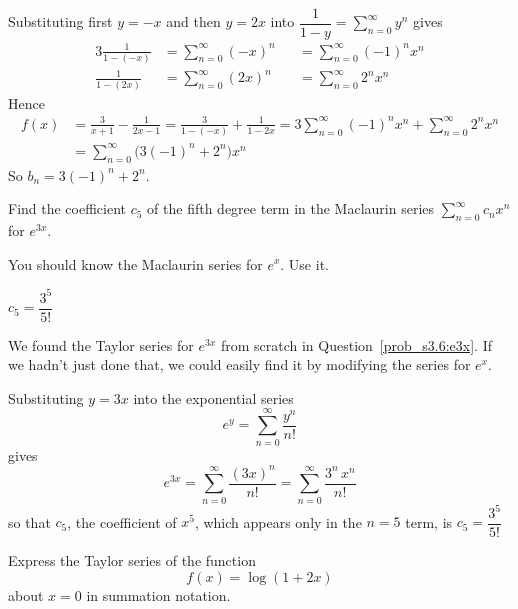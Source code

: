 \begin{solution}
Substituting first $y=-x$ and then $y=2x$ into
$\dfrac{1}{1-y} = \displaystyle\sum\limits_{n=0}^\infty y^n$ gives
\begin{alignat*}{3}
\frac{1}{1-(-x)} &= \sum_{n=0}^\infty (-x)^n&&=\sum_{n=0}^\infty (-1)^nx^n \\
\frac{1}{1-(2x)} &= \sum_{n=0}^\infty (2x)^n&&=\sum_{n=0}^\infty 2^nx^n
\end{alignat*}
Hence
\begin{align*}
f(x) &=\frac{3}{x+1} - \frac{1}{2x-1} = \frac{3}{1-(-x)} + \frac{1}{1-2x}
=3\sum_{n=0}^\infty (-1)^nx^n  +  \sum_{n=0}^\infty 2^nx^n \\
&=\sum_{n=0}^\infty \big(3(-1)^n + 2^n\big)x^n
\end{align*}
So $b_n = 3(-1)^n + 2^n$.


\end{solution}
\begin{question}[2014A]
Find the coefficient $c_5$ of the fifth degree term in the Maclaurin
series $\displaystyle\sum_{n=0}^\infty c_nx^n$ for $e^{3x}$.
\end{question}

\begin{hint}
You should know the Maclaurin series for $e^x$. Use it.
\end{hint}

\begin{answer}
$c_5=\dfrac{3^5}{5!}$
\end{answer}

\begin{solution}
We found the Taylor series for $e^{3x}$ from scratch in Question~\ref{prob_s3.6:e3x}. If we hadn't just done that, we could easily find it by modifying the series for $e^x$.

Substituting $y=3x$ into the exponential series
\begin{equation*}
e^y=\sum_{n=0}^\infty\frac{y^n}{n!}
\end{equation*}
gives
\begin{equation*}
e^{3x}=\sum_{n=0}^\infty\frac{(3x)^n}{n!}
=\sum_{n=0}^\infty\frac{3^n\,x^n}{n!}
\end{equation*}
so that $c_5$, the coefficient of $x^5$, which appears only in
the $n=5$ term, is
$c_5=\dfrac{3^5}{5!}$
\end{solution}

\begin{Mquestion}[M105 2012A]
Express the Taylor series of the function
\begin{equation*}
f(x) = \log(1 + 2x)
\end{equation*}
about $x = 0$ in summation notation.
\end{Mquestion}

